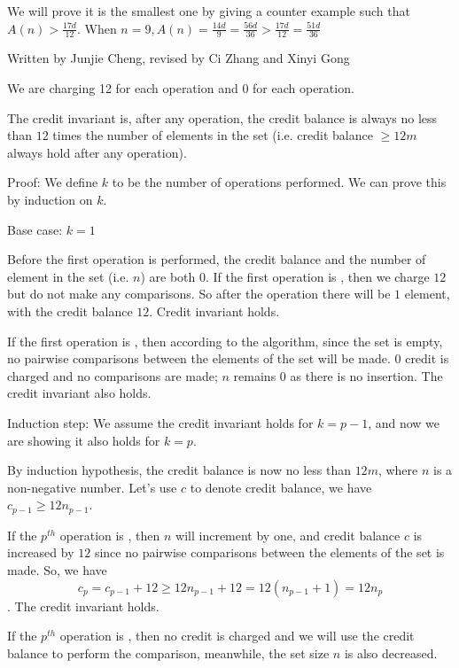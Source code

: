 \documentclass[11pt, answers]{exam}
\theoremstyle{plain}
\theoremstyle{definition}
\begin{document}
\begin{questions}
\begin{solution}
We will prove it is the smallest one by giving a counter example such that $A(n) > {\frac{17d}{12}}$. When $n = 9, A(n) = {\frac{14d}{9}} = {\frac{56d}{36}} > {\frac{17d}{12}} = {\frac{51d}{36}}$
\end{solution}


\question
\begin{solution}Written by Junjie Cheng, revised by Ci Zhang and Xinyi Gong


We are charging 12 for each  operation and 0 for each  operation.

The credit invariant is, after any operation, the credit balance is always no less than $12$ times the number of elements in the set (i.e. credit balance $\ge 12m$ always hold after any operation).

Proof: We define $k$ to be the number of operations performed. We can prove this by induction on $k$. 

Base case: $k=1$

Before the first operation is performed, the credit balance and the number of element in the set (i.e. $n$) are both $0$. If the first operation is , then we charge $12$ but do not make any comparisons. So after the operation there will be $1$ element, with the credit balance $12$. Credit invariant holds.

If the first operation is , then according to the algorithm, since the set is empty, no pairwise comparisons between the elements of the set will be made. $0$ credit is charged and no comparisons are made; $n$ remains $0$ as there is no insertion. The credit invariant also holds.

Induction step: We assume the credit invariant holds for $k=p-1$, and now we are showing it also holds for $k=p$.

By induction hypothesis, the credit balance is now no less than $12m$, where $n$ is a non-negative number. Let's use $c$ to denote credit balance, we have $c_{p-1} \ge 12n_{p-1}$.

If the $p^{th}$ operation is , then $n$ will increment by one, and credit balance $c$ is increased by $12$ since no pairwise comparisons between the elements of the set is made. So, we have $$c_p = c_{p-1} + 12 \ge 12n_{p-1} + 12 = 12(n_{p-1}+1) = 12n_p$$. The credit invariant holds.

If the $p^{th}$ operation is , then no credit is charged and we will use the credit balance to perform the comparison, meanwhile, the set size $n$ is also decreased.


\end{solution}
\end{questions}
\end{document}
